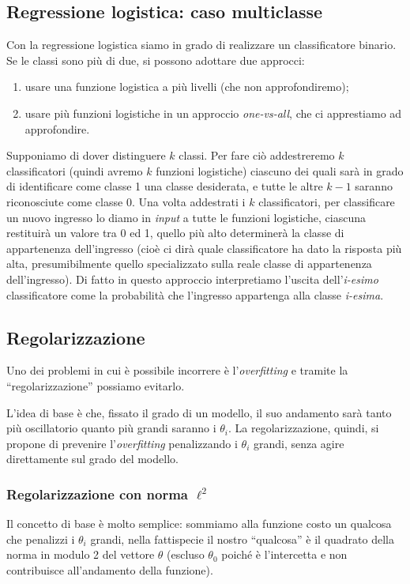 \subsection{Regressione logistica: caso multiclasse}
Con la regressione logistica siamo in grado di realizzare un classificatore binario. Se le classi sono più di due, si possono adottare due approcci:
\begin{enumerate}
\item usare una funzione logistica a più livelli (che non approfondiremo);
\item usare più funzioni logistiche in un approccio \emph{one-vs-all}, che ci apprestiamo ad approfondire.
\end{enumerate}
Supponiamo di dover distinguere $k$ classi. Per fare ciò addestreremo $k$ classificatori (quindi avremo $k$ funzioni logistiche) ciascuno dei quali sarà in grado di identificare come classe 1 una classe desiderata, e tutte le altre $k-1$ saranno riconosciute come classe 0. Una volta addestrati i $k$ classificatori, per classificare un nuovo ingresso lo diamo in \emph{input} a tutte le funzioni logistiche, ciascuna restituirà un valore tra 0 ed 1, quello più alto determinerà la classe di appartenenza dell'ingresso (cioè ci dirà quale classificatore ha dato la risposta più alta, presumibilmente quello specializzato sulla reale classe di appartenenza dell'ingresso). Di fatto in questo approccio interpretiamo l'uscita dell'\emph{i-esimo} classificatore come la probabilità che l'ingresso appartenga alla classe \emph{i-esima}.

\subsection{Regolarizzazione}
Uno dei problemi in cui è possibile incorrere è l'\emph{overfitting} e tramite la ``regolarizzazione'' possiamo evitarlo. 

L'idea di base è che, fissato il grado di un modello, il suo andamento sarà tanto più oscillatorio quanto più grandi saranno i $\theta_i$. La regolarizzazione, quindi, si propone di prevenire l'\emph{overfitting} penalizzando i $\theta_i$ grandi, senza agire direttamente sul grado del modello.

\subsubsection{Regolarizzazione con norma $\ell^2$}\label{sec:regolarizzazione_l2}

Il concetto di base è molto semplice: sommiamo alla funzione costo un qualcosa che penalizzi i $\theta_i$ grandi, nella fattispecie il nostro ``qualcosa'' è il quadrato della norma in modulo 2 del vettore 
 $\theta$ (escluso $\theta_0$ poiché è l'intercetta e non contribuisce all'andamento della funzione).

